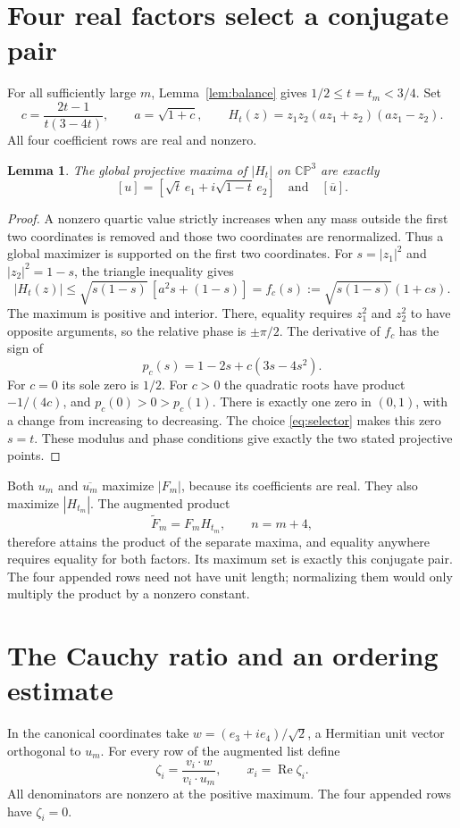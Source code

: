 \documentclass[11pt]{article}
\newtheorem{lemma}[theorem]{Lemma}
\theoremstyle{remark}
\DeclareMathOperator{\Rea}{Re}
\newcommand{\CP}{\mathbb{CP}}
\begin{document}
\section{Four real factors select a conjugate pair}
For all sufficiently large $m$, Lemma~\ref{lem:balance} gives $1/2\leq t=t_m<3/4$. Set
\begin{equation}\label{eq:selector}
 c=\frac{2t-1}{t(3-4t)},\qquad a=\sqrt{1+c},\qquad
 H_t(z)=z_1z_2(az_1+z_2)(az_1-z_2).
\end{equation}
All four coefficient rows are real and nonzero.

\begin{lemma}\label{lem:selector}
The global projective maxima of $|H_t|$ on $\CP^3$ are exactly
\[
 [u]=[\sqrt t\,e_1+i\sqrt{1-t}\,e_2]
 \quad\text{and}\quad[\overline u].
\]
\end{lemma}
\begin{proof}
A nonzero quartic value strictly increases when any mass outside the first two coordinates is removed and those two coordinates are renormalized. Thus a global maximizer is supported on the first two coordinates. For $s=|z_1|^2$ and $|z_2|^2=1-s$, the triangle inequality gives
\[
 |H_t(z)|\leq\sqrt{s(1-s)}\,[a^2s+(1-s)]
          =f_c(s):=\sqrt{s(1-s)}(1+cs).
\]
The maximum is positive and interior. There, equality requires $z_1^2$ and $z_2^2$ to have opposite arguments, so the relative phase is $\pm\pi/2$. The derivative of $f_c$ has the sign of
\[
 p_c(s)=1-2s+c(3s-4s^2).
\]
For $c=0$ its sole zero is $1/2$. For $c>0$ the quadratic roots have product $-1/(4c)$, and $p_c(0)>0>p_c(1)$. There is exactly one zero in $(0,1)$, with a change from increasing to decreasing. The choice \eqref{eq:selector} makes this zero $s=t$. These modulus and phase conditions give exactly the two stated projective points.
\end{proof}

Both $u_m$ and $\overline{u_m}$ maximize $|F_m|$, because its coefficients are real. They also maximize $|H_{t_m}|$. The augmented product
\[
 \widetilde F_m=F_mH_{t_m},\qquad n=m+4,
\]
therefore attains the product of the separate maxima, and equality anywhere requires equality for both factors. Its maximum set is exactly this conjugate pair. The four appended rows need not have unit length; normalizing them would only multiply the product by a nonzero constant.

\section{The Cauchy ratio and an ordering estimate}
In the canonical coordinates take $w=(e_3+ie_4)/\sqrt2$, a Hermitian unit vector orthogonal to $u_m$. For every row of the augmented list define
\begin{equation}\label{eq:ratios}
 \zeta_i=\frac{v_i\cdot w}{v_i\cdot u_m},\qquad x_i=\Rea\zeta_i.
\end{equation}
All denominators are nonzero at the positive maximum. The four appended rows have $\zeta_i=0$.
\end{document}
